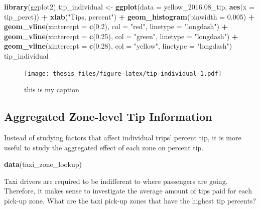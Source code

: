 \documentclass[12pt,twoside]{reedthesis}
\newenvironment{Shaded}{\begin{snugshade}}{\end{snugshade}}
\newcommand{\KeywordTok}[1]{\textcolor[rgb]{0.13,0.29,0.53}{\textbf{#1}}}
\newcommand{\DataTypeTok}[1]{\textcolor[rgb]{0.13,0.29,0.53}{#1}}
\newcommand{\FloatTok}[1]{\textcolor[rgb]{0.00,0.00,0.81}{#1}}
\newcommand{\StringTok}[1]{\textcolor[rgb]{0.31,0.60,0.02}{#1}}
\newcommand{\OperatorTok}[1]{\textcolor[rgb]{0.81,0.36,0.00}{\textbf{#1}}}
\newcommand{\NormalTok}[1]{#1}
\theoremstyle{definition}
\theoremstyle{definition}
\theoremstyle{definition}
\theoremstyle{remark}
\begin{document}
\begin{Shaded}
\begin{Highlighting}[]
\KeywordTok{library}\NormalTok{(ggplot2)}
\NormalTok{tip_individual <-}\StringTok{ }\KeywordTok{ggplot}\NormalTok{(}\DataTypeTok{data =}\NormalTok{ yellow_}\FloatTok{2016.}\NormalTok{08_tip, }\KeywordTok{aes}\NormalTok{(}\DataTypeTok{x =}\NormalTok{ tip_perct)) }\OperatorTok{+}\StringTok{ }
\StringTok{    }\KeywordTok{xlab}\NormalTok{(}\StringTok{"Tips, percent"}\NormalTok{) }\OperatorTok{+}\StringTok{ }\KeywordTok{geom_histogram}\NormalTok{(}\DataTypeTok{binwidth =} \FloatTok{0.005}\NormalTok{) }\OperatorTok{+}\StringTok{ }
\StringTok{    }\KeywordTok{geom_vline}\NormalTok{(}\DataTypeTok{xintercept =} \KeywordTok{c}\NormalTok{(}\FloatTok{0.2}\NormalTok{), }\DataTypeTok{col =} \StringTok{"red"}\NormalTok{, }\DataTypeTok{linetype =} \StringTok{"longdash"}\NormalTok{) }\OperatorTok{+}\StringTok{ }
\StringTok{    }\KeywordTok{geom_vline}\NormalTok{(}\DataTypeTok{xintercept =} \KeywordTok{c}\NormalTok{(}\FloatTok{0.25}\NormalTok{), }\DataTypeTok{col =} \StringTok{"green"}\NormalTok{, }\DataTypeTok{linetype =} \StringTok{"longdash"}\NormalTok{) }\OperatorTok{+}\StringTok{ }
\StringTok{    }\KeywordTok{geom_vline}\NormalTok{(}\DataTypeTok{xintercept =} \KeywordTok{c}\NormalTok{(}\FloatTok{0.28}\NormalTok{), }\DataTypeTok{col =} \StringTok{"yellow"}\NormalTok{, }\DataTypeTok{linetype =} \StringTok{"longdash"}\NormalTok{)}
\NormalTok{tip_individual}
\end{Highlighting}
\end{Shaded}
\begin{figure}
\centering
\texttt{[image: thesis\_files/figure-latex/tip-individual-1.pdf]}
\caption{\label{fig:tip-individual}this is my caption}
\end{figure}
\subsection{Aggregated Zone-level Tip
Information}\label{aggregated-zone-level-tip-information}

Instead of studying factors that affect individual trips' percent tip,
it is more useful to study the aggregated effect of each zone on percent
tip.
\begin{Shaded}
\begin{Highlighting}[]
\KeywordTok{data}\NormalTok{(taxi_zone_lookup)}
\end{Highlighting}
\end{Shaded}
Taxi drivers are required to be indifferent to where passengers are
going. Therefore, it makes sense to investigate the average amount of
tips paid for each pick-up zone. What are the taxi pick-up zones that
have the highest tip percents?
\end{document}
